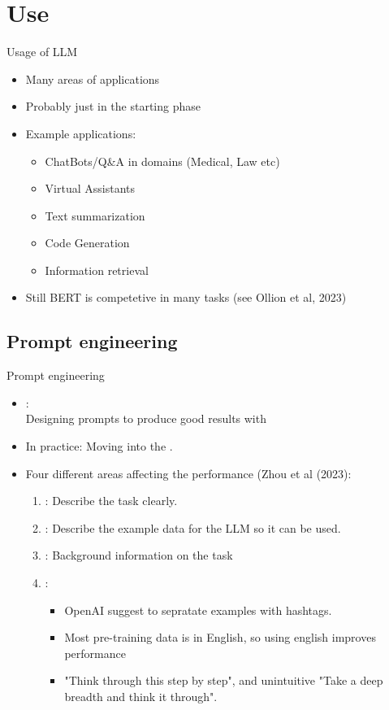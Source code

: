 \documentclass[10pt]{beamer}
\begin{document}
\section{Use}
\frame{\sectionpage}

\begin{frame}{Usage of LLM}
\begin{itemize}
\item Many areas of applications
\item Probably just in the starting phase
\pause
\item Example applications:
\begin{itemize}
\item ChatBots/Q\&A in domains (Medical, Law etc)
\item Virtual Assistants
\item Text summarization
\item Code Generation
\item Information retrieval
\end{itemize}
\pause
\item Still BERT is competetive in many tasks (see Ollion et al, 2023)
\end{itemize}
\end{frame}


\subsection{Prompt engineering}

\begin{frame}{Prompt engineering}

\begin{itemize}
\item {}: \\Designing prompts to produce good results with 
\item In practice: Moving into the .
\pause
\item Four different areas affecting the performance (Zhou et al (2023):
\begin{enumerate}
\pause
\item {}: Describe the task clearly.
\pause
\item {}: Describe the example data for the LLM so it can be used.
\pause
\item {}: Background information on the task
\pause
\item {}:
\begin{itemize}
\item OpenAI suggest to sepratate examples with hashtags.
\item Most pre-training data is in English, so using english improves performance
\item "Think through this step by step", and unintuitive "Take a deep breadth and think it through".
\end{itemize}
\end{enumerate}
\end{itemize}

\end{frame}
\end{document}
